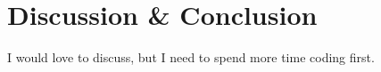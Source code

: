 \chapter{Discussion \& Conclusion}


I would love to discuss, but I need to spend more time coding first.